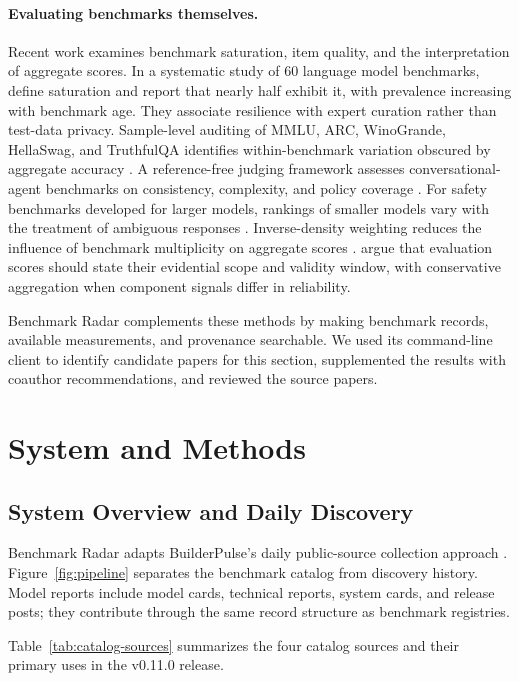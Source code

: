 \documentclass[11pt]{article}
\begin{document}
\paragraph{Evaluating benchmarks themselves.}
Recent work examines benchmark saturation, item quality, and the interpretation of aggregate scores. In a systematic study of 60 language model benchmarks, \citet{akhtar2026plateau} define saturation and report that nearly half exhibit it, with prevalence increasing with benchmark age. They associate resilience with expert curation rather than test-data privacy. Sample-level auditing of MMLU, ARC, WinoGrande, HellaSwag, and TruthfulQA identifies within-benchmark variation obscured by aggregate accuracy \citep{siedler2026benchmarks}. A reference-free judging framework assesses conversational-agent benchmarks on consistency, complexity, and policy coverage \citep{koren2026benchmarking}. For safety benchmarks developed for larger models, rankings of smaller models vary with the treatment of ambiguous responses \citep{shaik2026benchmarking}. Inverse-density weighting reduces the influence of benchmark multiplicity on aggregate scores \citep{lin2026balance}. \citet{gilda2026position} argue that evaluation scores should state their evidential scope and validity window, with conservative aggregation when component signals differ in reliability.

Benchmark Radar complements these methods by making benchmark records, available measurements, and provenance searchable. We used its command-line client to identify candidate papers for this section, supplemented the results with coauthor recommendations, and reviewed the source papers.

\section{System and Methods}

\subsection{System Overview and Daily Discovery}

Benchmark Radar adapts BuilderPulse's daily public-source collection approach \citep{builderpulse}. Figure~\ref{fig:pipeline} separates the benchmark catalog from discovery history. Model reports include model cards, technical reports, system cards, and release posts; they contribute through the same record structure as benchmark registries.

Table~\ref{tab:catalog-sources} summarizes the four catalog sources and their primary uses in the v0.11.0 release.
\end{document}

